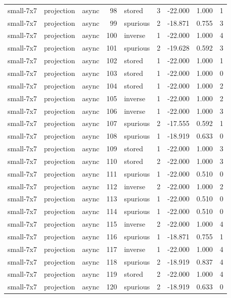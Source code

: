 \begin{tabular}{lllrlrrrr}
small-7x7 & projection & async & 98 & stored & 3 & -22.000 & 1.000 & 1 \\
small-7x7 & projection & async & 99 & spurious & 2 & -18.871 & 0.755 & 3 \\
small-7x7 & projection & async & 100 & inverse & 1 & -22.000 & 1.000 & 4 \\
small-7x7 & projection & async & 101 & spurious & 2 & -19.628 & 0.592 & 3 \\
small-7x7 & projection & async & 102 & stored & 1 & -22.000 & 1.000 & 1 \\
small-7x7 & projection & async & 103 & stored & 1 & -22.000 & 1.000 & 0 \\
small-7x7 & projection & async & 104 & stored & 1 & -22.000 & 1.000 & 2 \\
small-7x7 & projection & async & 105 & inverse & 1 & -22.000 & 1.000 & 2 \\
small-7x7 & projection & async & 106 & inverse & 1 & -22.000 & 1.000 & 3 \\
small-7x7 & projection & async & 107 & spurious & 2 & -17.555 & 0.592 & 1 \\
small-7x7 & projection & async & 108 & spurious & 1 & -18.919 & 0.633 & 0 \\
small-7x7 & projection & async & 109 & stored & 1 & -22.000 & 1.000 & 3 \\
small-7x7 & projection & async & 110 & stored & 2 & -22.000 & 1.000 & 3 \\
small-7x7 & projection & async & 111 & spurious & 1 & -22.000 & 0.510 & 0 \\
small-7x7 & projection & async & 112 & inverse & 2 & -22.000 & 1.000 & 2 \\
small-7x7 & projection & async & 113 & spurious & 1 & -22.000 & 0.510 & 0 \\
small-7x7 & projection & async & 114 & spurious & 1 & -22.000 & 0.510 & 0 \\
small-7x7 & projection & async & 115 & inverse & 2 & -22.000 & 1.000 & 4 \\
small-7x7 & projection & async & 116 & spurious & 1 & -18.871 & 0.755 & 1 \\
small-7x7 & projection & async & 117 & inverse & 1 & -22.000 & 1.000 & 4 \\
small-7x7 & projection & async & 118 & spurious & 2 & -18.919 & 0.837 & 4 \\
small-7x7 & projection & async & 119 & stored & 2 & -22.000 & 1.000 & 4 \\
small-7x7 & projection & async & 120 & spurious & 2 & -18.919 & 0.633 & 0 \\

\end{tabular}
